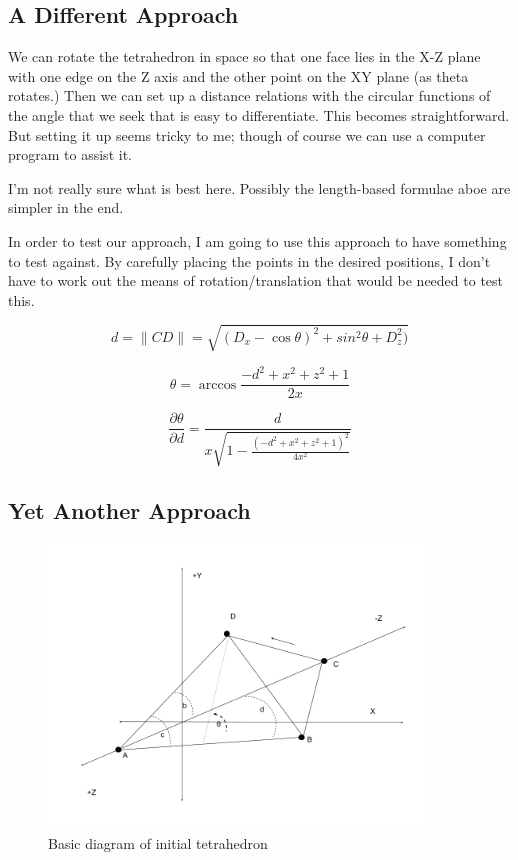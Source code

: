 \documentclass[11pt]{article}
\begin{document}
\subsection{A Different Approach}

We can rotate the tetrahedron in space so that one face lies in the X-Z plane with
one edge on the Z axis and the other point on the XY plane (as theta rotates.)
Then we can set up a distance relations with the circular
functions of the angle that we seek that is easy to differentiate. This
becomes straightforward. But setting it up seems tricky to me; though
of course we can use a computer program to assist it.

I'm not really sure what is best here. Possibly the length-based formulae
aboe are simpler in the end.

In order to test our approach, I am going to use this approach to have
something to test against.  By carefully placing the points in the desired
positions, I don't have to work out the means of rotation/translation
that would be needed to test this.

\[
d = \|CD \| = \sqrt{(D_x - \cos{\theta})^2 + sin^2{\theta} + D_z^2)}
\]

\[
\theta = \arccos{\frac{-d^2 + x^2 + z^2 + 1}{2 x}}
\]

\[
\frac{\partial \theta }{\partial d}   =  \frac{d}{x \sqrt{1 - \frac{(-d^2 + x^2 + z^2 + 1)^2}{4 x^2}}}
\]

\subsection{Yet Another Approach}

\begin{figure}
  \centering
     \includegraphics[width=0.90\textwidth]{figures/EasyToComputeTetDerivative.png}
     \caption{Basic diagram of initial tetrahedron}
  \label{fig:basic}     
\end{figure}
\end{document}
